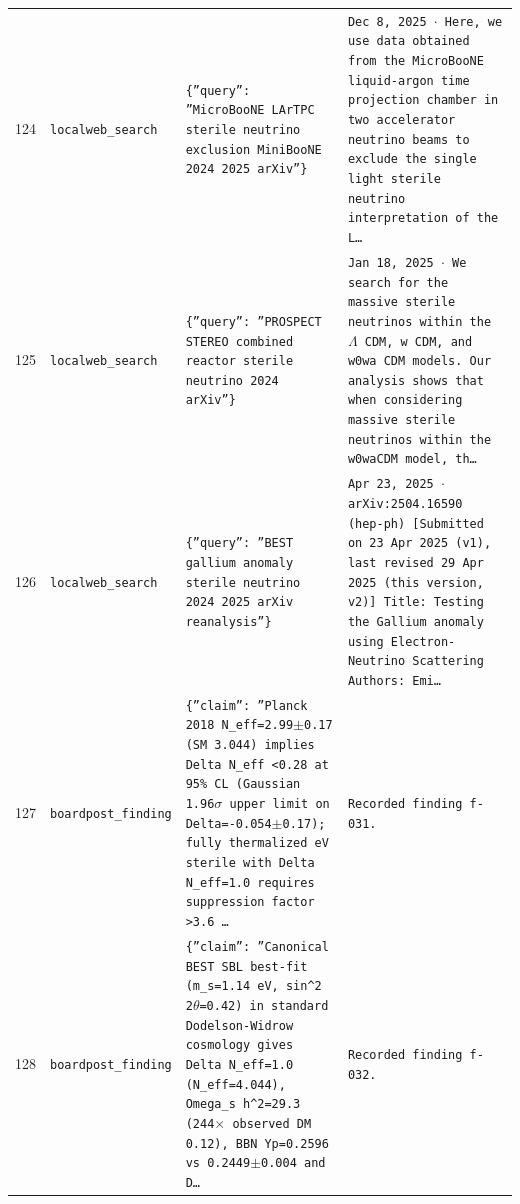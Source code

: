 \documentclass[11pt,a4paper]{article}
\begin{document}
\begin{longtable}{@{}p{}p{}p{}p{}@{}}
124 & \texttt{local}\newline\texttt{web\_\allowbreak{}search} & \texttt{\{''query'':\allowbreak{} ''MicroBooNE LArTPC sterile neutrino exclusion MiniBooNE 2024 2025 arXiv''\}\allowbreak{}} & \texttt{Dec 8,\allowbreak{} 2025 $\cdot$ Here,\allowbreak{} we use data obtained from the MicroBooNE liquid-argon time projection chamber in two accelerator neutrino beams to exclude the single light sterile neutrino interpretation of the L\ldots{}\allowbreak{}} \\
125 & \texttt{local}\newline\texttt{web\_\allowbreak{}search} & \texttt{\{''query'':\allowbreak{} ''PROSPECT STEREO combined reactor sterile neutrino 2024 arXiv''\}\allowbreak{}} & \texttt{Jan 18,\allowbreak{} 2025 $\cdot$ We search for the massive sterile neutrinos within the $\Lambda$ CDM,\allowbreak{} w CDM,\allowbreak{} and w0wa CDM models. Our analysis shows that when considering massive sterile neutrinos within the w0waCDM model,\allowbreak{} th\ldots{}\allowbreak{}} \\
126 & \texttt{local}\newline\texttt{web\_\allowbreak{}search} & \texttt{\{''query'':\allowbreak{} ''BEST gallium anomaly sterile neutrino 2024 2025 arXiv reanalysis''\}\allowbreak{}} & \texttt{Apr 23,\allowbreak{} 2025 $\cdot$ arXiv:\allowbreak{}2504.16590 (hep-ph)\allowbreak{} [Submitted on 23 Apr 2025 (v1)\allowbreak{},\allowbreak{} last revised 29 Apr 2025 (this version,\allowbreak{} v2)\allowbreak{}]\allowbreak{} Title:\allowbreak{} Testing the Gallium anomaly using Electron-Neutrino Scattering Authors:\allowbreak{} Emi\ldots{}\allowbreak{}} \\
127 & \texttt{board}\newline\texttt{post\_\allowbreak{}finding} & \texttt{\{''claim'':\allowbreak{} ''Planck 2018 N\_\allowbreak{}eff=\allowbreak{}2.99$\pm$0.17 (SM 3.044)\allowbreak{} implies Delta N\_\allowbreak{}eff \textless{}\allowbreak{}0.28 at 95\% CL (Gaussian 1.96$\sigma$ upper limit on Delta=\allowbreak{}-0.054$\pm$0.17)\allowbreak{};\allowbreak{} fully thermalized eV sterile with Delta N\_\allowbreak{}eff=\allowbreak{}1.0 requires suppression factor \textgreater{}\allowbreak{}3.6 \ldots{}\allowbreak{}} & \texttt{Recorded finding f-031.} \\
128 & \texttt{board}\newline\texttt{post\_\allowbreak{}finding} & \texttt{\{''claim'':\allowbreak{} ''Canonical BEST SBL best-fit (m\_\allowbreak{}s=\allowbreak{}1.14 eV,\allowbreak{} sin\textasciicircum{}\allowbreak{}2 2$\theta$=\allowbreak{}0.42)\allowbreak{} in standard Dodelson-Widrow cosmology gives Delta N\_\allowbreak{}eff=\allowbreak{}1.0 (N\_\allowbreak{}eff=\allowbreak{}4.044)\allowbreak{},\allowbreak{} Omega\_\allowbreak{}s h\textasciicircum{}\allowbreak{}2=\allowbreak{}29.3 (244$\times$ observed DM 0.12)\allowbreak{},\allowbreak{} BBN Yp=\allowbreak{}0.2596 vs 0.2449$\pm$0.004 and D\ldots{}\allowbreak{}} & \texttt{Recorded finding f-032.} \\

\end{longtable}
\end{document}
